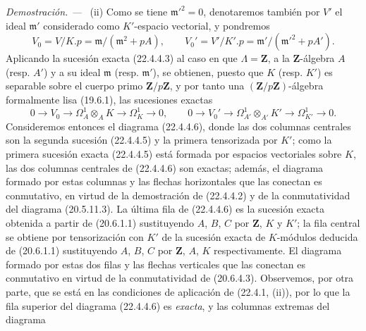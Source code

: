 \documentclass[10pt,oneside]{book}
\newcommand{\oldpage}[2][]{%
  \setcounter{footnote}{0}%
  \marginpar{\scriptsize\textbf{#1}~|~#2}\ignorespaces}
\newenvironment{proof}{%
  \par\medskip\noindent\textit{Demostración. ---\ }}{\par}
\begin{document}
\begin{proof}
(ii) Como se tiene $\mathfrak m'^2=0$, denotaremos también por $V'$ el ideal
$\mathfrak m'$ considerado como $K'$-espacio vectorial, y pondremos
\begin{equation}
\label{0.22.4.4.4-es}
  V_0=V/K.p=\mathfrak m/(\mathfrak m^2+pA),\qquad
  V_0'=V'/K'.p=\mathfrak m'/(\mathfrak m'^2+pA').
  \tag{22.4.4.4}
\end{equation}
Aplicando la sucesión exacta (22.4.4.3) al caso en que $\Lambda=\mathbf Z$, a la
$\mathbf Z$-álgebra $A$ (resp. $A'$) y a su ideal $\mathfrak m$
(resp. $\mathfrak m'$), se obtienen, puesto que $K$ (resp. $K'$) es separable sobre
el cuerpo primo $\mathbf Z/p\mathbf Z$, y por tanto una
$(\mathbf Z/p\mathbf Z)$-álgebra formalmente lisa (19.6.1), las sucesiones
exactas
\begin{equation}
\label{0.22.4.4.5-es}
  0\longrightarrow V_0\longrightarrow\Omega^1_A\otimes_AK
  \longrightarrow\Omega^1_K\longrightarrow0,\qquad
  0\longrightarrow V_0'\longrightarrow\Omega^1_{A'}\otimes_{A'}K'
  \longrightarrow\Omega^1_{K'}\longrightarrow0.
  \tag{22.4.4.5}
\end{equation}
Consideremos entonces el diagrama (22.4.4.6), donde las dos columnas centrales son
la segunda sucesión (22.4.4.5) y la primera tensorizada por $K'$; como la
primera sucesión exacta (22.4.4.5) está formada por espacios vectoriales sobre $K$,
las dos columnas centrales de (22.4.4.6) son exactas; además, el
diagrama formado por estas columnas y las flechas horizontales que las
conectan es conmutativo, en virtud de la demostración de (22.4.4.2) y de
la conmutatividad del diagrama (20.5.11.3). La última fila de (22.4.4.6)
es la sucesión exacta obtenida a partir de (20.6.1.1) sustituyendo $A$, $B$,
$C$ por $\mathbf Z$, $K$ y $K'$; la fila central se obtiene por
tensorización con $K'$ de la sucesión exacta de $K$-módulos deducida de
(20.6.1.1) sustituyendo $A$, $B$, $C$ por $\mathbf Z$, $A$, $K$
respectivamente. El diagrama formado por estas dos filas y las flechas
verticales que las conectan es conmutativo en virtud de la conmutatividad de
(20.6.4.3). Observemos, por otra parte, que se está en las condiciones de aplicación
de (22.4.1, (ii)), por lo que la fila superior del diagrama (22.4.4.6) es
\emph{exacta}, y las columnas extremas del diagrama

\oldpage[0\textsubscript{IV-1}]{196}


\end{proof}
\end{document}
